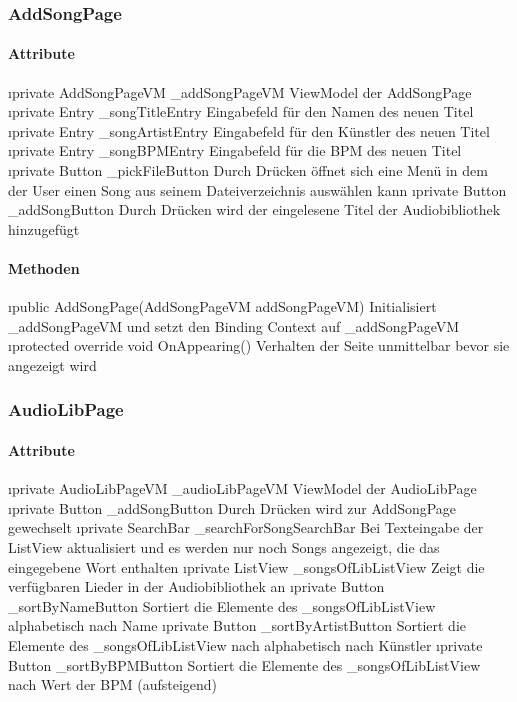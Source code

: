 \documentclass[../entwurf.tex]{subfiles}
\begin{document}
\subsubsection{AddSongPage}

\paragraph{Attribute}
\begin{itemize}
	\i{private AddSongPageVM \_addSongPageVM} ViewModel der AddSongPage
	\i{private Entry \_songTitleEntry} Eingabefeld für den Namen des neuen Titel
	\i{private Entry \_songArtistEntry} Eingabefeld für den Künstler des neuen Titel
	\i{private Entry \_songBPMEntry} Eingabefeld für die BPM des neuen Titel
	\i{private Button \_pickFileButton} Durch Drücken öffnet sich eine Menü in dem der User einen Song aus seinem Dateiverzeichnis auswählen kann
	\i{private Button \_addSongButton} Durch Drücken wird der eingelesene Titel der Audiobibliothek hinzugefügt
\end{itemize}

\paragraph{Methoden}
\begin{itemize}
	\i{public AddSongPage(AddSongPageVM addSongPageVM)} Initialisiert \_addSongPageVM und setzt den Binding Context 			auf \_addSongPageVM
	\i{protected override void OnAppearing()} Verhalten der Seite unmittelbar bevor sie angezeigt wird
\end{itemize}

\subsubsection{AudioLibPage}

\paragraph{Attribute}
\begin{itemize}
	\i{private AudioLibPageVM \_audioLibPageVM} ViewModel der AudioLibPage
	\i{private Button \_addSongButton} Durch Drücken wird zur AddSongPage gewechselt
	\i{private SearchBar \_searchForSongSearchBar} Bei Texteingabe der ListView aktualisiert und es werden nur noch Songs angezeigt, die das eingegebene Wort enthalten
	\i{private ListView \_songsOfLibListView} Zeigt die verfügbaren Lieder in der Audiobibliothek an
	\i{private Button \_sortByNameButton} Sortiert die Elemente des \_songsOfLibListView alphabetisch nach Name
	\i{private Button \_sortByArtistButton} Sortiert die Elemente des \_songsOfLibListView nach alphabetisch nach Künstler
	\i{private Button \_sortByBPMButton} Sortiert die Elemente des \_songsOfLibListView nach Wert der BPM (aufsteigend)
\end{itemize}
\end{document}
